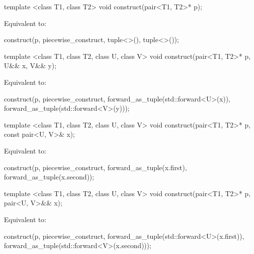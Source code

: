 %
\begin{itemdecl}
template <class T1, class T2>
  void construct(pair<T1, T2>* p);
\end{itemdecl}

\begin{itemdescr}
\pnum
\effects Equivalent to:
\begin{codeblock}
construct(p, piecewise_construct, tuple<>(), tuple<>());
\end{codeblock}
\end{itemdescr}

%
\begin{itemdecl}
template <class T1, class T2, class U, class V>
  void construct(pair<T1, T2>* p, U&& x, V&& y);
\end{itemdecl}

\begin{itemdescr}
\pnum
\effects Equivalent to:
\begin{codeblock}
construct(p, piecewise_construct,
          forward_as_tuple(std::forward<U>(x)),
          forward_as_tuple(std::forward<V>(y)));
\end{codeblock}
\end{itemdescr}

%
\begin{itemdecl}
template <class T1, class T2, class U, class V>
  void construct(pair<T1, T2>* p, const pair<U, V>& x);
\end{itemdecl}

\begin{itemdescr}
\pnum
\effects Equivalent to:
\begin{codeblock}
construct(p, piecewise_construct,
          forward_as_tuple(x.first),
          forward_as_tuple(x.second));
\end{codeblock}
\end{itemdescr}

%
\begin{itemdecl}
template <class T1, class T2, class U, class V>
  void construct(pair<T1, T2>* p, pair<U, V>&& x);
\end{itemdecl}

\begin{itemdescr}
\pnum
\effects Equivalent to:
\begin{codeblock}
construct(p, piecewise_construct,
          forward_as_tuple(std::forward<U>(x.first)),
          forward_as_tuple(std::forward<V>(x.second)));
\end{codeblock}
\end{itemdescr}

